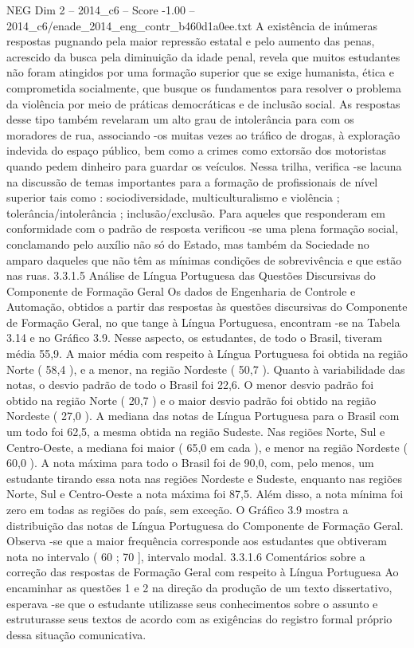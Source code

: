 \begin{textsample}{NEG Dim 2 – 2014\_c6 – Score -1.00 – 2014\_c6/enade\_2014\_eng\_contr\_b460d1a0ee.txt}
A existência de inúmeras respostas pugnando pela maior repressão estatal e pelo aumento das penas, acrescido da busca pela diminuição da idade penal, revela que muitos estudantes não foram atingidos por uma formação superior que se exige humanista, ética e comprometida socialmente, que busque os fundamentos para resolver o problema da violência por meio de práticas democráticas e de inclusão social.
As respostas desse tipo também revelaram um alto grau de intolerância para com os moradores de rua, associando -os muitas vezes ao tráfico de drogas, à exploração indevida do espaço público, bem como a crimes como extorsão dos motoristas quando pedem dinheiro para guardar os veículos.
Nessa trilha, verifica -se lacuna na discussão de temas importantes para a formação de profissionais de nível superior tais como : sociodiversidade, multiculturalismo e violência ; tolerância/intolerância ; inclusão/exclusão.
Para aqueles que responderam em conformidade com o padrão de resposta verificou -se uma plena formação social, conclamando pelo auxílio não só do Estado, mas também da Sociedade no amparo daqueles que não têm as mínimas condições de sobrevivência e que estão nas ruas. 3.3.1.5 Análise de Língua Portuguesa das Questões Discursivas do Componente de Formação Geral Os dados de Engenharia de Controle e Automação, obtidos a partir das respostas às questões discursivas do Componente de Formação Geral, no que tange à Língua Portuguesa, encontram -se na Tabela 3.14 e no Gráfico 3.9.
Nesse aspecto, os estudantes, de todo o Brasil, tiveram média 55,9.
A maior média com respeito à Língua Portuguesa foi obtida na região Norte ( 58,4 ), e a menor, na região Nordeste ( 50,7 ).
Quanto à variabilidade das notas, o desvio padrão de todo o Brasil foi 22,6.
O menor desvio padrão foi obtido na região Norte ( 20,7 ) e o maior desvio padrão foi obtido na região Nordeste ( 27,0 ).
A mediana das notas de Língua Portuguesa para o Brasil com um todo foi 62,5, a mesma obtida na região Sudeste.
Nas regiões Norte, Sul e Centro-Oeste, a mediana foi maior ( 65,0 em cada ), e menor na região Nordeste ( 60,0 ).
A nota máxima para todo o Brasil foi de 90,0, com, pelo menos, um estudante tirando essa nota nas regiões Nordeste e Sudeste, enquanto nas regiões Norte, Sul e Centro-Oeste a nota máxima foi 87,5.
Além disso, a nota mínima foi zero em todas as regiões do país, sem exceção.
O Gráfico 3.9 mostra a distribuição das notas de Língua Portuguesa do Componente de Formação Geral.
Observa -se que a maior frequência corresponde aos estudantes que obtiveram nota no intervalo ( 60 ; 70 ], intervalo modal. 3.3.1.6 Comentários sobre a correção das respostas de Formação Geral com respeito à Língua Portuguesa Ao encaminhar as questões 1 e 2 na direção da produção de um texto dissertativo, esperava -se que o estudante utilizasse seus conhecimentos sobre o assunto e estruturasse seus textos de acordo com as exigências do registro formal próprio dessa situação comunicativa.

\end{textsample}
